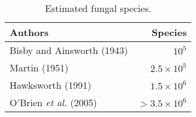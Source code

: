 \documentclass[twoside,12pt,english]{book}
\begin{document}
\begin{wraptable}{r}{7 cm}
\vspace{-.5cm}
\centering
\footnotesize
\caption{\label{wraptab}Estimated fungal species.}
\begin{tabular}{lr}\\\toprule  
Authors & Species \\\midrule
Bisby and Ainsworth (1943) & $10^5$ \\  
Martin (1951) &  $2.5\times10^5$  \\
Hawksworth (1991) & $1.5\times10^6$ \\ 
O’Brien \emph{et al.} (2005) & $>3.5\times10^6$ \\  \bottomrule
\end{tabular}
\end{wraptable} 


\lipsum[4-6]
\end{document}
